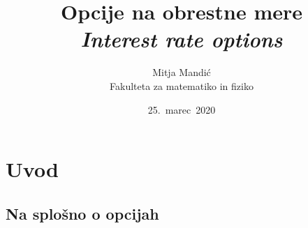 \documentclass[a4paper]{article}
\title{Opcije na obrestne mere\\
    \textit{Interest rate options}}
\author{Mitja Mandić \\ Fakulteta za matematiko in fiziko}
\date{25.\ marec\ 2020}
\begin{document}
\maketitle

\pagebreak

\begin{abstract}

\end{abstract}
\pagebreak

\section{Uvod}
\subsection{Na splošno o opcijah}
\end{document}
